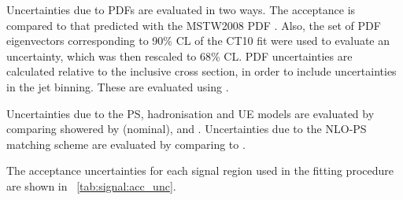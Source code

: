 Uncertainties due to \acp{PDF} are evaluated in two ways. The acceptance is compared to 
that predicted with the MSTW2008 PDF \cite{MSTW}. Also, the set of PDF eigenvectors 
corresponding to 90\% \ac{CL} of the CT10 fit were used to evaluate an uncertainty, 
which was then rescaled to 68\% \ac{CL}. PDF uncertainties are calculated relative to the 
inclusive cross section, in order to include uncertainties in the jet binning. These are 
evaluated using \mcatnlo.

Uncertainties due to the \ac{PS}, hadronisation and \ac{UE} models are evaluated by 
comparing \powhegbox showered by  (nominal),  and \fherwig. 
Uncertainties due to the NLO-PS matching scheme are evaluated by comparing 
\meps{\powhegbox}{\fherwig} to \meps{\mcatnlo}{\herwigpp}.

The acceptance uncertainties for each signal region used in the fitting procedure are 
shown in \Table~\ref{tab:signal:acc_unc}.

